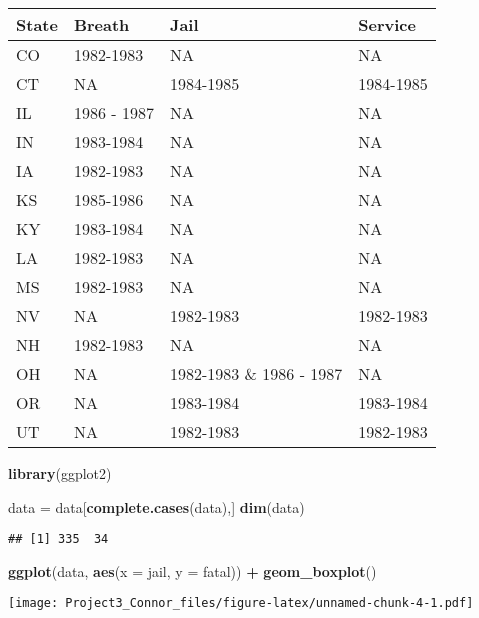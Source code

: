 \documentclass[]{article}
\newenvironment{Shaded}{\begin{snugshade}}{\end{snugshade}}
\newcommand{\DataTypeTok}[1]{\textcolor[rgb]{0.13,0.29,0.53}{#1}}
\newcommand{\DecValTok}[1]{\textcolor[rgb]{0.00,0.00,0.81}{#1}}
\newcommand{\KeywordTok}[1]{\textcolor[rgb]{0.13,0.29,0.53}{\textbf{#1}}}
\newcommand{\NormalTok}[1]{#1}
\newcommand{\OperatorTok}[1]{\textcolor[rgb]{0.81,0.36,0.00}{\textbf{#1}}}
\newcommand{\StringTok}[1]{\textcolor[rgb]{0.31,0.60,0.02}{#1}}
\begin{document}
\begin{tabular}{l|l|l|l}
\hline
State & Breath & Jail & Service\\
\hline
CO & 1982-1983 & NA & NA\\
\hline
CT & NA & 1984-1985 & 1984-1985\\
\hline
IL & 1986 - 1987 & NA & NA\\
\hline
IN & 1983-1984 & NA & NA\\
\hline
IA & 1982-1983 & NA & NA\\
\hline
KS & 1985-1986 & NA & NA\\
\hline
KY & 1983-1984 & NA & NA\\
\hline
LA & 1982-1983 & NA & NA\\
\hline
MS & 1982-1983 & NA & NA\\
\hline
NV & NA & 1982-1983 & 1982-1983\\
\hline
NH & 1982-1983 & NA & NA\\
\hline
OH & NA & 1982-1983 \& 1986 - 1987 & NA\\
\hline
OR & NA & 1983-1984 & 1983-1984\\
\hline
UT & NA & 1982-1983 & 1982-1983\\
\hline
\end{tabular}

\begin{Shaded}
\begin{Highlighting}[]
\KeywordTok{library}\NormalTok{(ggplot2)}

\NormalTok{data =}\StringTok{ }\NormalTok{data[}\KeywordTok{complete.cases}\NormalTok{(data),]}
\KeywordTok{dim}\NormalTok{(data)}
\end{Highlighting}
\end{Shaded}

\begin{verbatim}
## [1] 335  34
\end{verbatim}

\begin{Shaded}
\begin{Highlighting}[]
\KeywordTok{ggplot}\NormalTok{(data, }\KeywordTok{aes}\NormalTok{(}\DataTypeTok{x =}\NormalTok{ jail, }\DataTypeTok{y =}\NormalTok{ fatal)) }\OperatorTok{+}
\StringTok{  }\KeywordTok{geom_boxplot}\NormalTok{()}
\end{Highlighting}
\end{Shaded}

\texttt{[image: Project3\_Connor\_files/figure-latex/unnamed-chunk-4-1.pdf]}

\begin{Shaded}
\end{Shaded}
\end{document}
